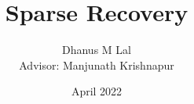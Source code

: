 \documentclass{article}
\title{Sparse Recovery}
\author{Dhanus M Lal\\
\small{Advisor: Manjunath Krishnapur}}
\date{April 2022}
\begin{document}
	\maketitle



\begin{multicols}{2}	
	

	

	

	
\nocite{hdp, gp, chaining, compressiveSensing, tao1, tao2, candes-tao, fourier}


\end{multicols}
\end{document}
